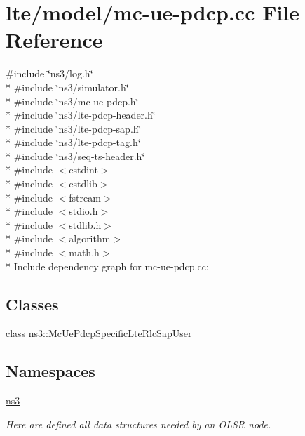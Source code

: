 \hypertarget{lte_2model_2mc-ue-pdcp_8cc}{}\section{lte/model/mc-\/ue-\/pdcp.cc File Reference}
\label{lte_2model_2mc-ue-pdcp_8cc}
{\ttfamily \#include \char`\"{}ns3/log.\+h\char`\"{}}\\*
{\ttfamily \#include \char`\"{}ns3/simulator.\+h\char`\"{}}\\*
{\ttfamily \#include \char`\"{}ns3/mc-\/ue-\/pdcp.\+h\char`\"{}}\\*
{\ttfamily \#include \char`\"{}ns3/lte-\/pdcp-\/header.\+h\char`\"{}}\\*
{\ttfamily \#include \char`\"{}ns3/lte-\/pdcp-\/sap.\+h\char`\"{}}\\*
{\ttfamily \#include \char`\"{}ns3/lte-\/pdcp-\/tag.\+h\char`\"{}}\\*
{\ttfamily \#include \char`\"{}ns3/seq-\/ts-\/header.\+h\char`\"{}}\\*
{\ttfamily \#include $<$cstdint$>$}\\*
{\ttfamily \#include $<$cstdlib$>$}\\*
{\ttfamily \#include $<$fstream$>$}\\*
{\ttfamily \#include $<$stdio.\+h$>$}\\*
{\ttfamily \#include $<$stdlib.\+h$>$}\\*
{\ttfamily \#include $<$algorithm$>$}\\*
{\ttfamily \#include $<$math.\+h$>$}\\*
Include dependency graph for mc-\/ue-\/pdcp.cc\+:
\subsection*{Classes}
\begin{DoxyCompactItemize}
\item 
class \hyperlink{classns3_1_1McUePdcpSpecificLteRlcSapUser}{ns3\+::\+Mc\+Ue\+Pdcp\+Specific\+Lte\+Rlc\+Sap\+User}
\end{DoxyCompactItemize}
\subsection*{Namespaces}
\begin{DoxyCompactItemize}
\item 
 \hyperlink{namespacens3}{ns3}
\begin{DoxyCompactList}\small\item\em Here are defined all data structures needed by an O\+L\+SR node. \end{DoxyCompactList}\end{DoxyCompactItemize}
